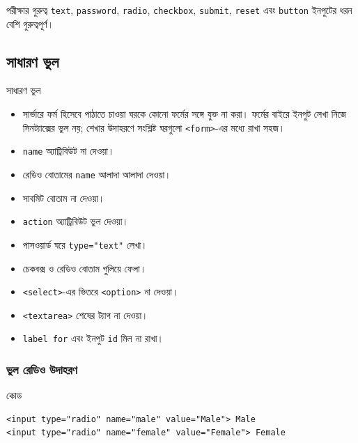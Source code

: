 \begin{keypointbox}{পরীক্ষার গুরুত্ব}
\texttt{text}, \texttt{password}, \texttt{radio}, \texttt{checkbox}, \texttt{submit}, \texttt{reset} এবং \texttt{button} ইনপুটের ধরন বেশি গুরুত্বপূর্ণ।
\end{keypointbox}

\subsection{সাধারণ ভুল}

\begin{mistakebox}{সাধারণ ভুল}
\begin{itemize}
\item সার্ভারে ফর্ম হিসেবে পাঠাতে চাওয়া ঘরকে কোনো ফর্মের সঙ্গে যুক্ত না করা। ফর্মের বাইরে ইনপুট লেখা নিজে সিনট্যাক্সের ভুল নয়; শেখার উদাহরণে সংশ্লিষ্ট ঘরগুলো \texttt{<form>}-এর মধ্যে রাখা সহজ।
\item \texttt{name} অ্যাট্রিবিউট না দেওয়া।
\item রেডিও বোতামের \texttt{name} আলাদা আলাদা দেওয়া।
\item সাবমিট বোতাম না দেওয়া।
\item \texttt{action} অ্যাট্রিবিউট ভুল দেওয়া।
\item পাসওয়ার্ড ঘরে \texttt{type="text"} লেখা।
\item চেকবক্স ও রেডিও বোতাম গুলিয়ে ফেলা।
\item \texttt{<select>}-এর ভিতরে \texttt{<option>} না দেওয়া।
\item \texttt{<textarea>} শেষের ট্যাগ না দেওয়া।
\item \texttt{label for} এবং ইনপুট \texttt{id} মিল না রাখা।
\end{itemize}
\end{mistakebox}

\subsubsection{ভুল রেডিও উদাহরণ}

\begin{examplebox}{কোড}
\par\noindent\begin{minipage}{\linewidth}
\begin{verbatim}
<input type="radio" name="male" value="Male"> Male
<input type="radio" name="female" value="Female"> Female
\end{verbatim}
\end{minipage}\par
\end{examplebox}

